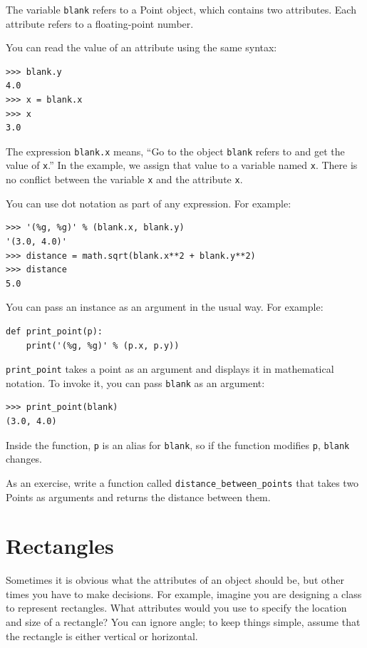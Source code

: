 \documentclass[10pt]{book}
\begin{document}
The variable {\tt blank} refers to a Point object, which
contains two attributes.  Each attribute refers to a
floating-point number.

You can read the value of an attribute using the same syntax:

\begin{verbatim}
>>> blank.y
4.0
>>> x = blank.x
>>> x
3.0
\end{verbatim}
%
The expression {\tt blank.x} means, ``Go to the object {\tt blank}
refers to and get the value of {\tt x}.''  In the example, we assign that
value to a variable named {\tt x}.  There is no conflict between
the variable {\tt x} and the attribute {\tt x}.

You can use dot notation as part of any expression.  For example:

\begin{verbatim}
>>> '(%g, %g)' % (blank.x, blank.y)
'(3.0, 4.0)'
>>> distance = math.sqrt(blank.x**2 + blank.y**2)
>>> distance
5.0
\end{verbatim}
%
You can pass an instance as an argument in the usual way.
For example:

\begin{verbatim}
def print_point(p):
    print('(%g, %g)' % (p.x, p.y))
\end{verbatim}
%
\verb"print_point" takes a point as an argument and displays it in
mathematical notation.  To invoke it, you can pass {\tt blank} as
an argument:

\begin{verbatim}
>>> print_point(blank)
(3.0, 4.0)
\end{verbatim}
%
Inside the function, {\tt p} is an alias for {\tt blank}, so if
the function modifies {\tt p}, {\tt blank} changes.

As an exercise, write a function called \verb"distance_between_points"
that takes two Points as arguments and returns the distance between
them.


\section{Rectangles}
\label{rectangles}

Sometimes it is obvious what the attributes of an object should be,
but other times you have to make decisions.  For example, imagine you
are designing a class to represent rectangles.  What attributes would
you use to specify the location and size of a rectangle?  You can
ignore angle; to keep things simple, assume that the rectangle is
either vertical or horizontal.
\end{document}
